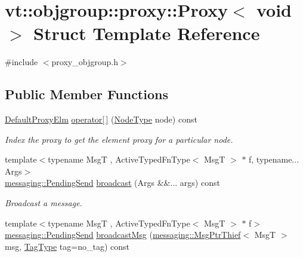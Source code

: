 \hypertarget{structvt_1_1objgroup_1_1proxy_1_1_proxy_3_01void_01_4}{}\section{vt\+:\+:objgroup\+:\+:proxy\+:\+:Proxy$<$ void $>$ Struct Template Reference}
\label{structvt_1_1objgroup_1_1proxy_1_1_proxy_3_01void_01_4}


{\ttfamily \#include $<$proxy\+\_\+objgroup.\+h$>$}

\subsection*{Public Member Functions}
\begin{DoxyCompactItemize}
\item 
\hyperlink{namespacevt_1_1objgroup_1_1proxy_ae207233400f23aa10c30217cdb369c54}{Default\+Proxy\+Elm} \hyperlink{structvt_1_1objgroup_1_1proxy_1_1_proxy_3_01void_01_4_a133d35ed66d898376ec5bb6e758183ed}{operator\mbox{[}$\,$\mbox{]}} (\hyperlink{namespacevt_a866da9d0efc19c0a1ce79e9e492f47e2}{Node\+Type} node) const
\begin{DoxyCompactList}\small\item\em Index the proxy to get the element proxy for a particular node. \end{DoxyCompactList}\item 
{\footnotesize template$<$typename MsgT , Active\+Typed\+Fn\+Type$<$ Msg\+T $>$ $\ast$ f, typename... Args$>$ }\\\hyperlink{structvt_1_1messaging_1_1_pending_send}{messaging\+::\+Pending\+Send} \hyperlink{structvt_1_1objgroup_1_1proxy_1_1_proxy_3_01void_01_4_a13f8d6751a246a449e7d13ae7eed3541}{broadcast} (Args \&\&... args) const
\begin{DoxyCompactList}\small\item\em Broadcast a message. \end{DoxyCompactList}\item 
{\footnotesize template$<$typename MsgT , Active\+Typed\+Fn\+Type$<$ Msg\+T $>$ $\ast$ f$>$ }\\\hyperlink{structvt_1_1messaging_1_1_pending_send}{messaging\+::\+Pending\+Send} \hyperlink{structvt_1_1objgroup_1_1proxy_1_1_proxy_3_01void_01_4_ae600f4143bb8102bc15264adc713dfea}{broadcast\+Msg} (\hyperlink{structvt_1_1messaging_1_1_msg_ptr_thief}{messaging\+::\+Msg\+Ptr\+Thief}$<$ MsgT $>$ msg, \hyperlink{namespacevt_a84ab281dae04a52a4b243d6bf62d0e52}{Tag\+Type} tag=no\+\_\+tag) const

\end{DoxyCompactItemize}
